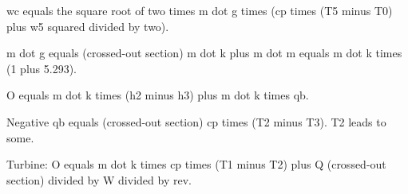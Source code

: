 wc equals the square root of two times m dot g times (cp times (T5 minus T0) plus w5 squared divided by two).

m dot g equals (crossed-out section) m dot k plus m dot m equals m dot k times (1 plus 5.293).

O equals m dot k times (h2 minus h3) plus m dot k times qb.

Negative qb equals (crossed-out section) cp times (T2 minus T3).  
T2 leads to some.

Turbine:  
O equals m dot k times cp times (T1 minus T2) plus Q (crossed-out section) divided by W divided by rev.